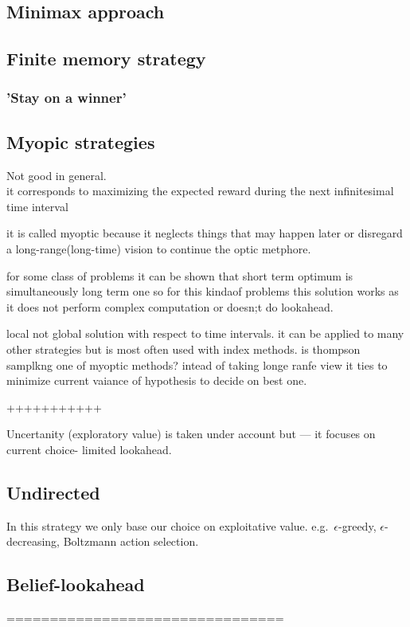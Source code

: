 \documentclass[12pt, a4paper, pdflatex, leqno]{report}
\begin{document}
\subsection{Minimax approach}

\subsection{Finite memory strategy}
\subsubsection{'Stay on a winner'}

\subsection{Myopic strategies}
Not good in general.\\

it corresponds to maximizing the expected reward during the next infinitesimal time interval

it is called myoptic because it neglects things that may happen later or disregard a long-range(long-time) vision to continue the optic metphore.

for some class of problems it can be shown that short term optimum is simultaneously long term one so for this kindaof problems this solution works as it does not perform complex computation or doesn;t do lookahead.

local not global solution with respect to time intervals.
it can be applied to many other strategies but is most often used with index methods.
is thompson samplkng one of myoptic methods? intead of taking longe ranfe view it ties to minimize current vaiance of hypothesis to decide on best one.

+++++++++++

Uncertanity (exploratory value) is taken under account but --- it focuses on current choice- limited lookahead.

\subsection{Undirected}
In this strategy we only base our choice on exploitative value. e.g.\ $\epsilon$-greedy, $\epsilon$-decreasing, Boltzmann action selection.

\subsection{Belief-lookahead}
================================
\end{document}

